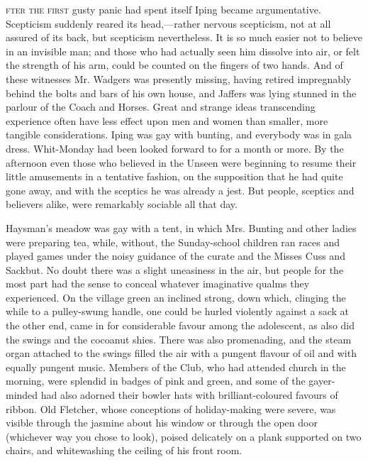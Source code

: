 \label{ch:10}
\begin{ChapterStart}
\vspace*{2\nbs}

\vspace{1.5\nbs}
\vspace{0.75\nbs}
\end{ChapterStart}

\kern-3pt\textsc{fter the first} gusty panic had spent itself Iping became argumentative. Scepticism suddenly reared its head,—rather nervous scepticism, not at all assured of its back, but scepticism nevertheless. It is so much easier not to believe in an invisible man; and those who had actually seen him dissolve into air, or felt the strength of his arm, could be counted on the fingers of two hands. And of these witnesses Mr. Wadgers was presently missing, having retired impregnably behind the bolts and bars of his own house, and Jaffers was lying stunned in the parlour of the Coach and Horses. Great and strange ideas transcending experience often have less effect upon men and women than smaller, more tangible considerations. Iping was gay with bunting, and everybody was in gala dress. Whit-Monday had been looked forward to for a month or more. By the afternoon even those who believed in the Unseen were beginning to resume their little amusements in a tentative fashion, on the supposition that he had quite gone away, and with the sceptics he was already a jest. But people, sceptics and believers alike, were remarkably sociable all that day.

Haysman’s meadow was gay with a tent, in which Mrs. Bunting and other ladies were preparing tea, while, without, the Sunday-school children ran races and played games under the noisy guidance of the curate and the Misses Cuss and Sackbut. No doubt there was a slight uneasiness in the air, but people for the most part had the sense to conceal whatever imaginative qualms they experienced. On the village green an inclined strong, down which, clinging the while to a pulley-swung handle, one could be hurled violently against a sack at the other end, came in for considerable favour among the adolescent, as also did the swings and the cocoanut shies. There was also promenading, and the steam organ attached to the swings filled the air with a pungent flavour of oil and with equally pungent music. Members of the Club, who had attended church in the morning, were splendid in badges of pink and green, and some of the gayer-minded had also adorned their bowler hats with brilliant-coloured favours of ribbon. Old Fletcher, whose conceptions of holiday-making were severe, was visible through the jasmine about his window or through the open door (whichever way you chose to look), poised delicately on a plank supported on two chairs, and whitewashing the ceiling of his front room.

